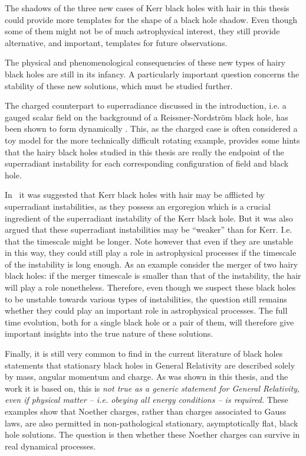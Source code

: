 The shadows of the three new cases of Kerr black holes with hair in this thesis could provide more templates for the shape of a black hole shadow.
Even though some of them might not be of much astrophysical interest, they still provide alternative, and important, templates for future observations.

\bigskip

The physical and phenomenological consequencies of these new types of hairy black holes are still in its infancy.
A particularly important question concerns the stability of these new solutions, which must be studied further.

The charged counterpart to superradiance discussed in the introduction, i.e. a gauged scalar field on the background of a Reissner-Nordström black hole, has been shown to form dynamically \cite{Sanchis-Gual:2015lje}.
This, as the charged case is often considered a toy model for the more technically difficult rotating example, provides some hints that the hairy black holes studied in this thesis are really the endpoint of the superradiant instability for each corresponding configuration of field and black hole.

In~\cite{Herdeiro:2014jaa} it was suggested that Kerr black holes with hair may be afflicted by superradiant instabilities, as they possess an ergoregion which is a crucial ingredient of the superradiant instability of the Kerr black hole.
But it was also argued that these superradiant instabilities may be ``weaker''  than for Kerr.
I.e. that the timescale might be longer.
Note however that even if they are unstable in this way, they could still play a role in astrophysical processes if the timescale of the instability is long enough.
As an example consider the merger of two hairy black holes: if the merger timescale is smaller than that of the instability, the hair will play a role nonetheless.
Therefore, even though we suspect these black holes to be unstable towards various types of instabilities, the question still remains whether they could play an important role in astrophysical processes.
The full time evolution, both for a single black hole or a pair of them, will therefore give important insights into the true nature of these solutions.


\bigskip

Finally, it is still very common to find in the current literature of black holes statements that stationary black holes in General Relativity are described solely by mass, angular momentum and charge.
As was shown in this thesis, and the work it is based on, this is \textit{not true as a generic statement for General Relativity, even if physical matter -- i.e. obeying all energy conditions -- is required.}
These examples show that Noether charges, rather than charges associated to Gauss laws, are also permitted in non-pathological stationary, asymptotically flat, black hole solutions. 
The question is then whether these Noether charges can survive in real dynamical processes.

